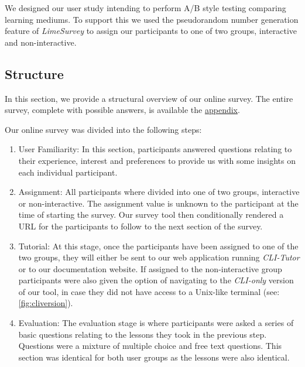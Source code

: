We designed our user study intending to perform A/B style testing
comparing learning mediums. To support this we used the pseudorandom number
generation feature of \textit{LimeSurvey} to assign our participants to one of
two groups, interactive and non-interactive.

\subsection{Structure}

In this section, we provide a structural overview of our online survey. The
entire survey, complete with possible answers, is available the
\hyperref[chap:appendixa]{appendix}.

Our online survey was divided into the following steps:

\begin{enumerate}

	\item User Familiarity: In this section, participants answered questions relating
	      to their experience, interest and preferences to provide us with some
	      insights on each individual participant.

	\item Assignment: All participants where divided into one of two groups,
	      interactive or non-interactive. The assignment value is unknown to the
	      participant at the time of starting the survey. Our survey tool then
	      conditionally rendered a URL for the participants to follow to the next
	      section of the survey.

	\item Tutorial: At this stage, once the participants have been assigned to
	      one of the two groups, they will either be sent to our web application
	      running \textit{CLI-Tutor} or to our documentation website. If assigned
	      to the non-interactive group participants were also given the option of
	      navigating to the \textit{CLI-only} version of our tool, in case they
	      did not have access to a Unix-like terminal (see:
	      \autoref{fig:cliversion}).

	\item Evaluation: The evaluation stage is where participants were asked a
	      series of basic questions relating to the lessons they took in the
	      previous step. Questions were a mixture of multiple choice and free
	      text questions. This section was identical for both user groups as the
	      lessons were also identical.


\end{enumerate}
